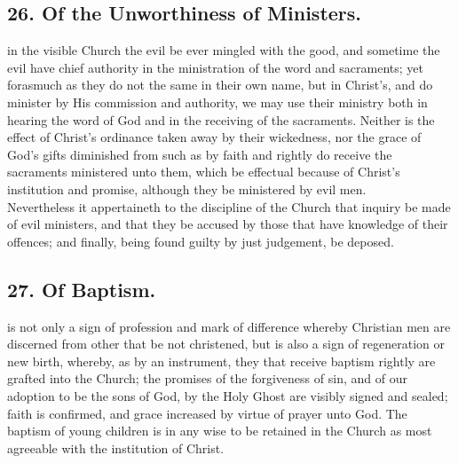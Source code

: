 \subsection{26. Of the Unworthiness of Ministers.}
 in the visible Church the evil be ever mingled with the good, and sometime the evil have chief authority in the ministration of the word and sacraments; yet forasmuch as they do not the same in their own name, but in Christ's, and do minister by His commission and authority, we may use their ministry both in hearing the word of God and in the receiving of the sacraments. Neither is the effect of Christ's ordinance taken away by their wickedness, nor the grace of God's gifts diminished from such as by faith and rightly do receive the sacraments ministered unto them, which be effectual because of Christ's institution and promise, although they be ministered by evil men.\\
Nevertheless it appertaineth to the discipline of the Church that inquiry be made of evil ministers, and that they be accused by those that have knowledge of their offences; and finally, being found guilty by just judgement, be deposed.

\subsection{27. Of Baptism.}
 is not only a sign of profession and mark of difference whereby Christian men are discerned from other that be not christened, but is also a sign of regeneration or new birth, whereby, as by an instrument, they that receive baptism rightly are grafted into the Church; the promises of the forgiveness of sin, and of our adoption to be the sons of God, by the Holy Ghost are visibly signed and sealed; faith is confirmed, and grace increased by virtue of prayer unto God. The baptism of young children is in any wise to be retained in the Church as most agreeable with the institution of Christ.

